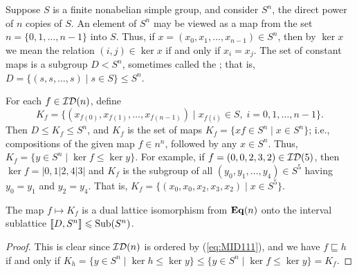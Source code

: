 Suppose $S$ is a finite nonabelian simple
group, and consider $S^n$, the direct power of $n$ copies of $S$.
An element of $S^n$ may be viewed as a map from the set 
$n = \{0, 1, \dots, n-1\}$ into $S$.  Thus, if 
$x = (x_0, x_1, \dots, x_{n-1})\in S^n$, then by 
$\ker x$ we mean the relation $(i,j) \in \ker x$ if and only if $x_i = x_j$.
The set of constant maps is a subgroup $D < S^n$, sometimes called the
; that is,
$D = \{(s, s, \dots, s) \mid s\in S\} \leq S^n$.

For each $f \in \mathcal{ID}(n)$, define
\[
K_f = \{(x_{f(0)}, x_{f(1)}, \dots, x_{f(n-1)}) \mid x_{f(i)}\in S, \; i = 0, 1,
\dots, n-1\}.
\]
Then $D \leq K_f\leq S^n$, and $K_f$ is the set of maps
$K_f = \{x f \in S^n \mid x \in S^n \}$; i.e., compositions of the given
map $f\in n^n$, followed by  any $x\in S^n$.  Thus, 
$K_f = \{ y\in S^n \mid \ker f \leq \ker y \}$.
For example, 
if $f = (0, 0, 2, 3, 2)\in \mathcal{ID}(5)$, then 
$\ker f = |0,1|2,4|3|$ and 
$K_f$ is the subgroup %
of all $(y_0, y_1, \dots, y_4)\in S^5$ having $y_0 = y_1$ and $y_2 = y_4$. That is,
$K_f = \{(x_{0}, x_{0}, x_2, x_3, x_2) \mid x\in S^5\}$.

\begin{lemma}
  \label{lem:latt-duals}
  The map $f \mapsto K_f$ is a dual lattice isomorphism from $\mathbf{Eq}(n)$ onto the
  interval sublattice $\llbracket D, S^n\rrbracket \leqslant \operatorname{Sub}(S^n)$.
\end{lemma}
\begin{proof}
  This is clear since $\mathcal{ID}(n)$ is ordered by (\ref{eq:MID111}), and 
  we have 
  $f\sqsubseteq h$ if and only if
  $K_h = \{y \in S^n \mid \ker h \leq \ker y \}
  \leq \{y \in S^n \mid \ker f \leq \ker y \} =  K_f$.
\end{proof}


